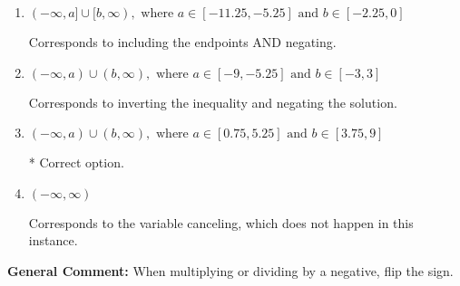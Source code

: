 \documentclass{extbook}[14pt]
\begin{document}
\begin{enumerate}
{\begin{enumerate}[label=\Alph*.]
Corresponds to including the endpoints (when they should be excluded).
\item \( (-\infty, a] \cup [b, \infty), \text{ where } a \in [-11.25, -5.25] \text{ and } b \in [-2.25, 0] \)

Corresponds to including the endpoints AND negating.
\item \( (-\infty, a) \cup (b, \infty), \text{ where } a \in [-9, -5.25] \text{ and } b \in [-3, 3] \)

Corresponds to inverting the inequality and negating the solution.
\item \( (-\infty, a) \cup (b, \infty), \text{ where } a \in [0.75, 5.25] \text{ and } b \in [3.75, 9] \)

 * Correct option.
\item \( (-\infty, \infty) \)

Corresponds to the variable canceling, which does not happen in this instance.
\end{enumerate}

\textbf{General Comment:} When multiplying or dividing by a negative, flip the sign.
}
\end{enumerate}
\end{document}
